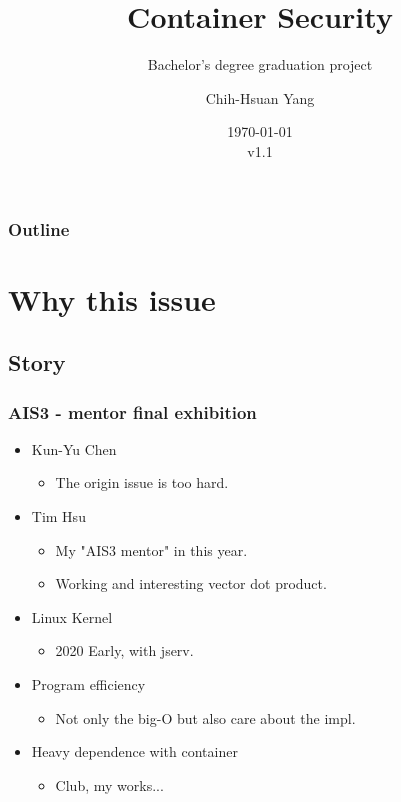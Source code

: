 \documentclass{beamer}
\title{Container Security}
\subtitle{Bachelor's degree graduation project}
\author{Chih-Hsuan Yang}
\institute{National Sun Yat-sen University}
\date{\today\\v1.1}
\begin{document}
\begin{frame}
    \titlepage
\end{frame}

\begin{frame}
    \frametitle{Outline}
    \tableofcontents
\end{frame}

\section{Why this issue}
\subsection{Story}
\begin{frame}
    \frametitle{AIS3 - mentor final exhibition}

    \begin{itemize}
        \item Kun-Yu Chen
              \begin{itemize}
                  \item The origin issue is too hard.
              \end{itemize}
        \item Tim Hsu
              \begin{itemize}
                  \item My "AIS3 mentor" in this year.
                  \item Working and interesting vector dot product.
              \end{itemize}
        \item Linux Kernel
              \begin{itemize}
                  \item 2020 Early, with jserv.
              \end{itemize}
        \item Program efficiency
              \begin{itemize}
                  \item Not only the big-O but also care about the impl.
              \end{itemize}
        \item Heavy dependence with container
              \begin{itemize}
                  \item Club, my works...
              \end{itemize}
    \end{itemize}

\end{frame}
\end{document}
